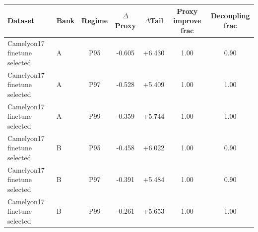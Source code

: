 \begin{tabular}{llccccc}
  \toprule
  Dataset & Bank & Regime & $\Delta$Proxy & $\Delta$Tail & Proxy improve frac & Decoupling frac \\
  \midrule
  Camelyon17 finetune selected & A & P95 & -0.605 & +6.430 & 1.00 & 0.90 \\
  Camelyon17 finetune selected & A & P97 & -0.528 & +5.409 & 1.00 & 1.00 \\
  Camelyon17 finetune selected & A & P99 & -0.359 & +5.744 & 1.00 & 1.00 \\
  Camelyon17 finetune selected & B & P95 & -0.458 & +6.022 & 1.00 & 0.90 \\
  Camelyon17 finetune selected & B & P97 & -0.391 & +5.484 & 1.00 & 0.90 \\
  Camelyon17 finetune selected & B & P99 & -0.261 & +5.653 & 1.00 & 1.00 \\
  \bottomrule
\end{tabular}
